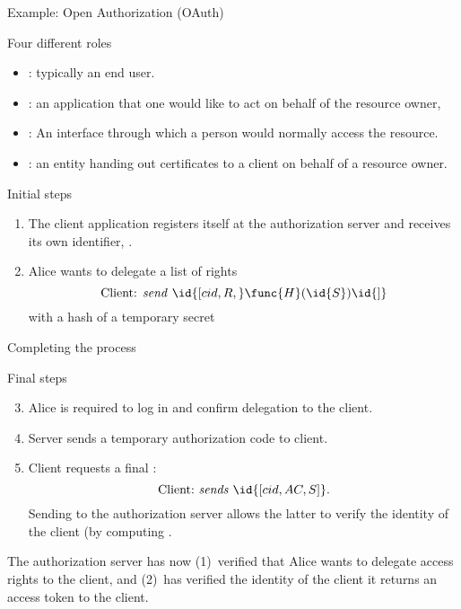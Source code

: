   \begin{slide}{Example: Open Authorization (OAuth)}
    \begin{block}{Four different roles}
      \begin{itemize}\firmlist
      \item {}: typically an end user.
      \item {}: an application that one would like to act on behalf of the resource owner,
      \item {}: An interface through which a person would normally access the resource.
      \item {}: an entity handing out certificates to a client on behalf of a resource
        owner.
      \end{itemize}
    \end{block}

    \begin{block}{Initial steps}
      \begin{enumerate}
      \item The client application registers itself at the authorization server and receives its own identifier,
        .
      \item Alice wants to delegate a list  of rights \mathexpr{\Rightarrow}
      \[
      \mbox{Client: \emph{send}\ } \id{[cid, R,}\func{H}(\id{S})\id{]}
      \]
      with a hash of a temporary secret 
      \end{enumerate}
    \end{block}
  \end{slide}
  \begin{slide}{Completing the process}
    \begin{block}{Final steps}
      \begin{enumerate}
        \setcounter{enumi}{2}
      \item Alice is required to log in and confirm delegation  to the client.
      \item Server sends a temporary authorization code  to client.
      \item Client requests a final :
        \[
        \mbox{Client:\ \emph{sends}\ } \id{[cid, AC, S]}.
        \]
        Sending  to the authorization server allows the latter to verify the identity of the client (by
        computing .
      \end{enumerate}
      The authorization server has now (1)~verified that Alice wants to delegate access rights to the client,
      and (2)~has verified the identity of the client \mathexpr{\Rightarrow} it returns an access token to the
      client.
    \end{block}
  \end{slide}
